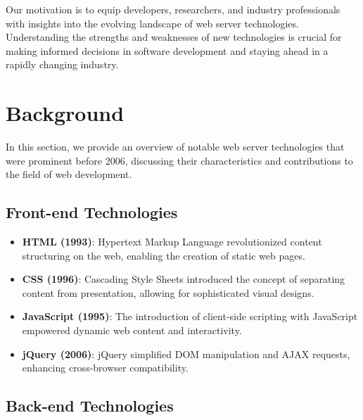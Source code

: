 \documentclass[conference]{IEEEtran}
\begin{document}
Our motivation is to equip developers, researchers, and industry professionals with insights into the evolving landscape of web server technologies. Understanding the strengths and weaknesses of new technologies is crucial for making informed decisions in software development and staying ahead in a rapidly changing industry.

\section{Background}

In this section, we provide an overview of notable web server technologies that were prominent before 2006, discussing their characteristics and contributions to the field of web development.

\subsection{Front-end Technologies}

\begin{itemize}
    \item \textbf{HTML (1993)}: Hypertext Markup Language revolutionized content structuring on the web, enabling the creation of static web pages.
    
    \item \textbf{CSS (1996)}: Cascading Style Sheets introduced the concept of separating content from presentation, allowing for sophisticated visual designs.
    
    \item \textbf{JavaScript (1995)}: The introduction of client-side scripting with JavaScript empowered dynamic web content and interactivity.
    
    \item \textbf{jQuery (2006)}: jQuery simplified DOM manipulation and AJAX requests, enhancing cross-browser compatibility.

\end{itemize}

\subsection{Back-end Technologies}
\end{document}
